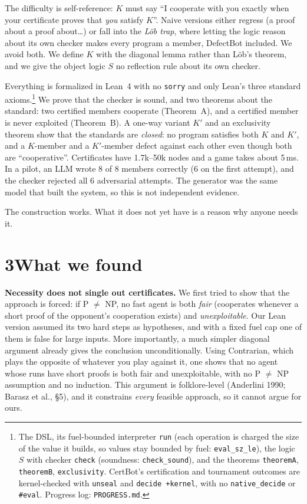 \documentclass[11pt]{article}
\begin{document}
The difficulty is self-reference: $K$ must say ``I cooperate with you exactly when your certificate proves that \emph{you} satisfy $K$''. Naive versions either regress (a proof about a proof about\ldots) or fall into the \emph{Löb trap}, where letting the logic reason about its own checker makes every program a member, DefectBot included. We avoid both. We define $K$ with the diagonal lemma rather than Löb's theorem, and we give the object logic $S$ no reflection rule about its own checker.

Everything is formalized in Lean~4 with no \texttt{sorry} and only Lean's three standard axioms.\footnote{The DSL, its fuel-bounded interpreter \texttt{run} (each operation is charged the size of the value it builds, so values stay bounded by fuel: \texttt{eval\_sz\_le}), the logic $S$ with checker \texttt{check} (soundness: \texttt{check\_sound}), and the theorems \texttt{theoremA}, \texttt{theoremB}, \texttt{exclusivity}. CertBot's certification and tournament outcomes are kernel-checked with \texttt{unseal} and \texttt{decide +kernel}, with no \texttt{native\_decide} or \texttt{\#eval}. Progress log: \texttt{PROGRESS.md}.} We prove that the checker is sound, and two theorems about the standard: two certified members cooperate (Theorem~A), and a certified member is never exploited (Theorem~B). A one-way variant $K'$ and an exclusivity theorem show that the standards are \emph{closed}: no program satisfies both $K$ and $K'$, and a $K$-member and a $K'$-member defect against each other even though both are ``cooperative''. Certificates have 1.7k--50k nodes and a game takes about 5\,ms. In a pilot, an LLM wrote 8 of 8 members correctly (6 on the first attempt), and the checker rejected all 6 adversarial attempts. The generator was the same model that built the system, so this is not independent evidence.

The construction works. What it does not yet have is a reason why anyone needs it.

\section*{3\quad What we found}

\textbf{Necessity does not single out certificates.} We first tried to show that the approach is forced: if P $\neq$ NP, no fast agent is both \emph{fair} (cooperates whenever a short proof of the opponent's cooperation exists) and \emph{unexploitable}. Our Lean version assumed its two hard steps as hypotheses, and with a fixed fuel cap one of them is false for large inputs. More importantly, a much simpler diagonal argument already gives the conclusion unconditionally. Using Contrarian, which plays the opposite of whatever you play against it, one shows that no agent whose runs have short proofs is both fair and unexploitable, with no P $\neq$ NP assumption and no induction. This argument is folklore-level (Anderlini 1990; Barasz et al., \S5), and it constrains \emph{every} feasible approach, so it cannot argue for ours.
\end{document}

